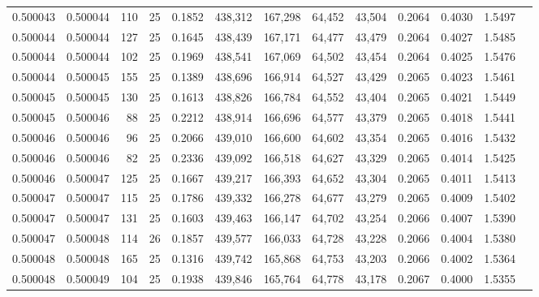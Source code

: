 \begin{tabular}{rrrrrrrrrrrrr}
0.500043 & 0.500044 & 110 &  25 &                                     0.1852 & 438,312 & 167,298 &  64,452 &  43,504 & 0.2064 & 0.4030 & 1.5497 \\
0.500044 & 0.500044 & 127 &  25 &                                     0.1645 & 438,439 & 167,171 &  64,477 &  43,479 & 0.2064 & 0.4027 & 1.5485 \\
0.500044 & 0.500044 & 102 &  25 &                                     0.1969 & 438,541 & 167,069 &  64,502 &  43,454 & 0.2064 & 0.4025 & 1.5476 \\
0.500044 & 0.500045 & 155 &  25 &                                     0.1389 & 438,696 & 166,914 &  64,527 &  43,429 & 0.2065 & 0.4023 & 1.5461 \\
0.500045 & 0.500045 & 130 &  25 &                                     0.1613 & 438,826 & 166,784 &  64,552 &  43,404 & 0.2065 & 0.4021 & 1.5449 \\
0.500045 & 0.500046 &  88 &  25 &                                     0.2212 & 438,914 & 166,696 &  64,577 &  43,379 & 0.2065 & 0.4018 & 1.5441 \\
0.500046 & 0.500046 &  96 &  25 &                                     0.2066 & 439,010 & 166,600 &  64,602 &  43,354 & 0.2065 & 0.4016 & 1.5432 \\
0.500046 & 0.500046 &  82 &  25 &                                     0.2336 & 439,092 & 166,518 &  64,627 &  43,329 & 0.2065 & 0.4014 & 1.5425 \\
0.500046 & 0.500047 & 125 &  25 &                                     0.1667 & 439,217 & 166,393 &  64,652 &  43,304 & 0.2065 & 0.4011 & 1.5413 \\
0.500047 & 0.500047 & 115 &  25 &                                     0.1786 & 439,332 & 166,278 &  64,677 &  43,279 & 0.2065 & 0.4009 & 1.5402 \\
0.500047 & 0.500047 & 131 &  25 &                                     0.1603 & 439,463 & 166,147 &  64,702 &  43,254 & 0.2066 & 0.4007 & 1.5390 \\
0.500047 & 0.500048 & 114 &  26 &                                     0.1857 & 439,577 & 166,033 &  64,728 &  43,228 & 0.2066 & 0.4004 & 1.5380 \\
0.500048 & 0.500048 & 165 &  25 &                                     0.1316 & 439,742 & 165,868 &  64,753 &  43,203 & 0.2066 & 0.4002 & 1.5364 \\
0.500048 & 0.500049 & 104 &  25 &                                     0.1938 & 439,846 & 165,764 &  64,778 &  43,178 & 0.2067 & 0.4000 & 1.5355 \\

\end{tabular}
